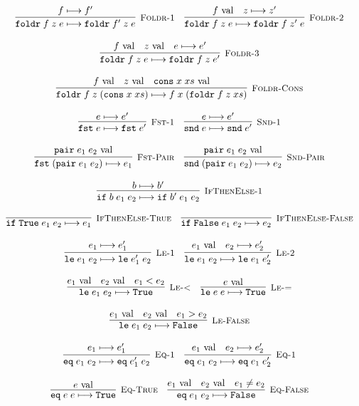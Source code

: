 \documentclass[10pt]{article}
\newcommand{\ttt}[1]{\texttt{#1}}
\newcommand{\reduces}{\ensuremath{\longmapsto}}
\newcommand{\val}{\textnormal{ val}}
\newcommand{\True}{\ttt{True}}
\newcommand{\False}{\ttt{False}}
\newcommand{\cons}{\ttt{cons}}
\newcommand{\foldr}{\ttt{foldr}}
\newcommand{\pair}{\ttt{pair}}
\newcommand{\fst}{\ttt{fst}}
\newcommand{\snd}{\ttt{snd}}
\newcommand{\ite}{\ttt{if}}
\newcommand{\lesseq}{\ttt{le}}
\newcommand{\eq}{\ttt{eq}}
\newcommand{\labinfer} [3] [] {\infer[{\small\textsc{#1}}]{#2}{#3}}
\begin{document}
\[\begin{array}{cc}
    \labinfer[Foldr-1]{\foldr\; f\; z\; e \reduces \foldr\; f'\; z\; e}{f \reduces f'}
    ~~~
    \labinfer[Foldr-2]{\foldr\; f\; z\; e \reduces \foldr\; f\; z'\; e}{f \val & z \reduces z'}
    \\\\
    \labinfer[Foldr-3]{\foldr\; f\; z\; e \reduces \foldr\; f\; z\; e'}{f \val & z \val & e \reduces e'}
    \\\\
    \labinfer[Foldr-Cons]{\foldr\; f\; z\; (\cons\; x\; xs) \reduces f\; x\; (\foldr\; f\; z\; xs)}{f \val & z \val & \cons\; x\; xs \val}
    \\\\
    \labinfer[Fst-1]{\fst\; e \reduces \fst\; e'}{e \reduces e'}
    ~~~
    \labinfer[Snd-1]{\snd\; e \reduces \snd\; e'}{e \reduces e'}
    \\\\
    \labinfer[Fst-Pair]{\fst\; (\pair\; e_1\; e_2) \reduces e_1}{\pair\; e_1\; e_2 \val}
    ~~~
    \labinfer[Snd-Pair]{\snd\; (\pair\; e_1\; e_2) \reduces e_2}{\pair\; e_1\; e_2 \val}
    \\\\
    \labinfer[IfThenElse-1]{\ite\; b\; e_1\; e_2 \reduces \ite\; b'\; e_1\; e_2}{b \reduces b'}
    \\\\
    \labinfer[IfThenElse-True]{\ite\; \True\; e_1\; e_2 \reduces e_1}{}
    ~~~
    \labinfer[IfThenElse-False]{\ite\; \False\; e_1\; e_2 \reduces e_2}{}
    \\\\
    \labinfer[Le-1]{\lesseq\; e_1\; e_2 \reduces \lesseq\; e_1'\; e_2}{e_1 \reduces e_1'}
    ~~~
    \labinfer[Le-2]{\lesseq\; e_1\; e_2 \reduces \lesseq\; e_1\; e_2'}{e_1 \val & e_2 \reduces e_2'}
    \\\\
    \labinfer[Le-<]{\lesseq\; e_1\; e_2 \reduces \True}{e_1 \val & e_2 \val & e_1 < e_2}
    ~~~
    \labinfer[Le-=]{\lesseq\; e\; e \reduces \True}{e \val}
    \\\\
    \labinfer[Le-False]{\lesseq\; e_1\; e_2 \reduces \False}{e_1 \val & e_2 \val & e_1 > e_2}
    \\\\
    \labinfer[Eq-1]{\eq\; e_1\; e_2 \reduces \eq\; e_1'\; e_2}{e_1 \reduces e_1'}
    ~~~
    \labinfer[Eq-1]{\eq\; e_1\; e_2 \reduces \eq\; e_1\; e_2'}{e_1 \val & e_2 \reduces e_2'}
    \\\\
    \labinfer[Eq-True]{\eq\; e\; e \reduces \True}{e \val}
    ~~~
    \labinfer[Eq-False]{\eq\; e_1\; e_2 \reduces \False}{e_1 \val & e_2 \val & e_1 \neq e_2}
    
  \end{array}
\]
\end{document}
